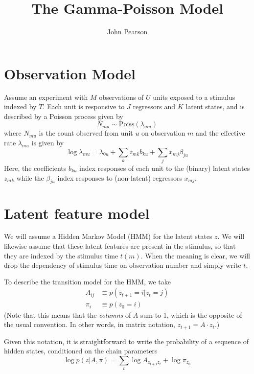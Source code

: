 \documentclass[11pt]{article}
\begin{document}
\title{The Gamma-Poisson Model}
\author{John Pearson}
\maketitle

\section{Observation Model}
Assume an experiment with $M$ observations of $U$ units exposed to a stimulus indexed by $T$. Each unit is responsive to $J$ regressors and $K$ latent states, and is described by a Poisson process given by 
\begin{equation}
    N_{mu} \sim \mathrm{Poiss}(\lambda_{mu}) 
\end{equation}
where $N_{mu}$ is the count observed from unit $u$ on observation $m$ and the effective rate $\lambda_{mu}$ is given by 
\begin{equation}
    \log \lambda_{mu} = \lambda_{0u} + \sum_k z_{mk} b_{ku} + \sum_j x_{mj} \beta_{ju} 
\end{equation}
Here, the coefficients $b_{ku}$ index responses of each unit to the (binary) latent states $z_{mk}$ while the $\beta_{ju}$ index responses to (non-latent) regressors $x_{mj}$.

\section{Latent feature model}
We will assume a Hidden Markov Model (HMM) for the latent states $z$. We will likewise assume that these latent features are present in the stimulus, so that they are indexed by the stimulus time $t(m)$. When the meaning is clear, we will drop the dependency of stimulus time on observation number and simply write $t$.

To describe the transition model for the HMM, we take
\begin{align}
    A_{ij} &\equiv p(z_{t+1} = i|z_t = j) \\
    \pi_i &\equiv p(z_0 = i)
\end{align}
(Note that this means that the \emph{columns} of $A$ sum to 1, which is the opposite of the usual convention. In other words, in matrix notation, $z_{t+1} = A \cdot z_t$.)

Given this notation, it is straightforward to write the probability of a sequence of hidden states, conditioned on the chain parameters
\begin{equation}
    \log p(z|A, \pi) = \sum_t \log A_{z_{t+1} z_t} + \log \pi_{z_0}
\end{equation}
\end{document}
